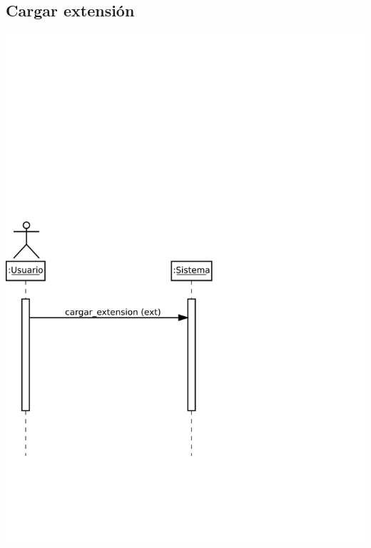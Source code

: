 \subsection{Cargar extensión}
\begin{center}
\includegraphics[scale=0.4]{cagar_extension.png} \\
\end{center}

